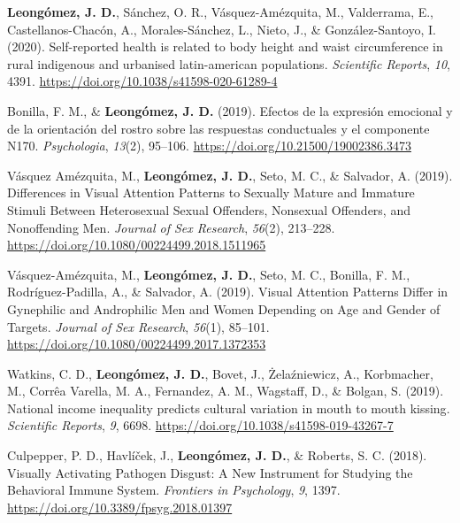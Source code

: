 \documentclass[11pt,a4paper,]{awesome-cv}
\begin{document}
\leavevmode{}%
\textbf{Leongómez, J. D.}, Sánchez, O. R., Vásquez-Amézquita, M.,
Valderrama, E., Castellanos-Chacón, A., Morales-Sánchez, L., Nieto, J.,
\& González-Santoyo, I. (2020). Self-reported health is related to body
height and waist circumference in rural indigenous and urbanised
latin-american populations. \emph{Scientific Reports}, \emph{10}, 4391.
\url{https://doi.org/10.1038/s41598-020-61289-4}

\leavevmode{}%
Bonilla, F. M., \& \textbf{Leongómez, J. D.} (2019). {Efectos de la
expresi{ó}n emocional y de la orientaci{ó}n del rostro sobre las
respuestas conductuales y el componente N170}. \emph{Psychologia},
\emph{13}(2), 95--106. \url{https://doi.org/10.21500/19002386.3473}

\leavevmode{}%
Vásquez Amézquita, M., \textbf{Leongómez, J. D.}, Seto, M. C., \&
Salvador, A. (2019). {Differences in Visual Attention Patterns to
Sexually Mature and Immature Stimuli Between Heterosexual Sexual
Offenders, Nonsexual Offenders, and Nonoffending Men}. \emph{Journal of
Sex Research}, \emph{56}(2), 213--228.
\url{https://doi.org/10.1080/00224499.2018.1511965}

\leavevmode{}%
Vásquez-Amézquita, M., \textbf{Leongómez, J. D.}, Seto, M. C., Bonilla,
F. M., Rodríguez-Padilla, A., \& Salvador, A. (2019). {Visual Attention
Patterns Differ in Gynephilic and Androphilic Men and Women Depending on
Age and Gender of Targets}. \emph{Journal of Sex Research},
\emph{56}(1), 85--101.
\url{https://doi.org/10.1080/00224499.2017.1372353}

\leavevmode{}%
Watkins, C. D., \textbf{Leongómez, J. D.}, Bovet, J., Żelaźniewicz, A.,
Korbmacher, M., Corrêa Varella, M. A., Fernandez, A. M., Wagstaff, D.,
\& Bolgan, S. (2019). {National income inequality predicts cultural
variation in mouth to mouth kissing}. \emph{Scientific Reports},
\emph{9}, 6698. \url{https://doi.org/10.1038/s41598-019-43267-7}

\leavevmode{}%
Culpepper, P. D., Havlíček, J., \textbf{Leongómez, J. D.}, \& Roberts,
S. C. (2018). {Visually Activating Pathogen Disgust: A New Instrument
for Studying the Behavioral Immune System}. \emph{Frontiers in
Psychology}, \emph{9}, 1397.
\url{https://doi.org/10.3389/fpsyg.2018.01397}
\end{document}
